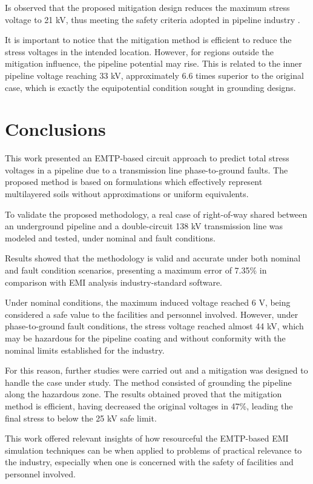 \documentclass{IEEEtran4PSCC}
\begin{document}
Is observed that the proposed mitigation design reduces the maximum stress voltage to 21 kV, thus meeting the safety criteria adopted in pipeline industry \cite{NACEInternational2007}. 

It is important to notice that the mitigation method is efficient to reduce the stress voltages in the intended location. However, for regions outside the mitigation influence, the pipeline potential may rise. This is related to the inner pipeline voltage reaching 33 kV, approximately 6.6 times superior to the original case, which is exactly the equipotential condition sought in grounding designs.

\section{Conclusions}

This work presented an EMTP-based circuit approach to predict total stress voltages in a pipeline due to a transmission line phase-to-ground faults. The proposed method is based on formulations which effectively represent multilayered soils without approximations or uniform equivalents. 

To validate the proposed methodology, a real case of right-of-way shared between an underground pipeline and a double-circuit 138 kV transmission line was modeled and tested, under nominal and fault conditions. 

Results showed that the methodology is valid and accurate under both nominal and fault condition scenarios, presenting a maximum error of 7.35\% in comparison with  EMI analysis industry-standard software.

Under nominal conditions, the maximum induced voltage reached 6 V, being considered a safe value to the facilities and personnel involved. However, under phase-to-ground fault conditions, the stress voltage reached almost 44 kV, which may be hazardous for the pipeline coating and without conformity with the nominal limits established for the industry. 

For this reason, further studies were carried out and a mitigation was designed to handle the case under study. The method consisted of grounding the pipeline along the hazardous zone. The results obtained proved that the mitigation method is efficient, having decreased  the original voltages in 47\%, leading the final stress to below the 25 kV safe limit. 

This work offered relevant insights of how resourceful the EMTP-based EMI simulation techniques can be when applied to problems of practical relevance to the industry, especially when one is concerned with the safety of facilities and personnel involved.


\nocite{*}

\end{document}
